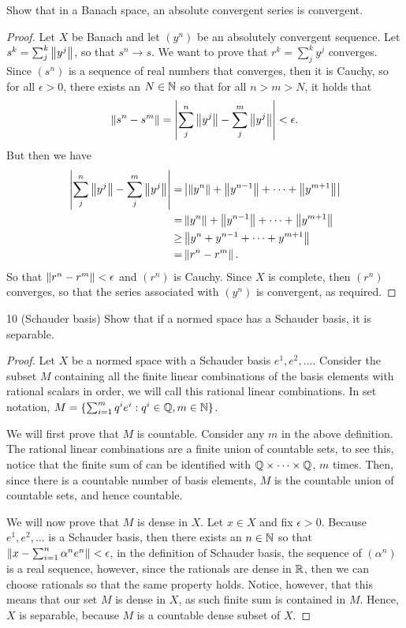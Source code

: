 \begin{exercise}{9}
Show that in a Banach space, an absolute convergent series is convergent.
\end{exercise}
\begin{proof}
Let $X$ be Banach and let $(y^n)$ be an absolutely convergent sequence. Let $s^k=\sum^k_j \left\lVert y^j\right\rVert$, so that $s^n\to s$. We want to prove that $r^k=\sum^k_j y^j$ converges. Since $(s^n)$ is a sequence of real numbers that converges,  then it is Cauchy, so for all $\epsilon>0$, there exists an $N\in\mathbb{N}$ so that for all $n>m>N$, it holds that
\[
    \left\lVert s^n-s^m\right\rVert = \left\lvert \sum^n_j \left\lVert y^j\right\rVert-\sum^m_j \left\lVert y^j\right\rVert\right\rvert <\epsilon.
\]
But then we have
\begin{align*}
    \left\lvert \sum^n_j \left\lVert y^j\right\rVert-\sum^m_j \left\lVert y^j\right\rVert\right\rvert
    =& \left\lvert \left\lVert y^n\right\rVert+\left\lVert y^{n-1}\right\rVert+\dots+\left\lVert y^{m+1}\right\rVert\right\rvert\\
    =& \left\lVert y^n\right\rVert+\left\lVert y^{n-1}\right\rVert+\dots+\left\lVert y^{m+1}\right\rVert\\
    \geq& \left\lVert y^n+y^{n-1}+\dots+y^{m+1}\right\rVert\\
    =& \left\lVert r^n-r^m\right\rVert.
\end{align*}
So that $\left\lVert r^n-r^m\right\rVert<\epsilon$ and $(r^n)$ is Cauchy. Since $X$ is complete, then $(r^n)$ converges, so that the series associated with $(y^n)$ is convergent, as required.
\end{proof}

\begin{exercise}{10 (Schauder basis)}
Show that if a normed space has a Schauder basis, it is separable.
\end{exercise}
\begin{proof}
Let $X$ be a normed space with a Schauder basis $e^1,e^2,\dots$. Consider the subset $M$ containing all the finite linear combinations of the basis elements with rational scalars in order, we will call this rational linear combinations. In set notation, $M=\{\sum_{i=1}^m q^ie^i:q^i\in\mathbb{Q}, m\in\mathbb{N}\}$.

We will first prove that $M$ is countable. Consider any $m$ in the above definition. The rational linear combinations are a finite union of countable sets, to see this, notice that the finite sum of can be identified with $\mathbb{Q}\times\dots\times\mathbb{Q}$, $m$ times. Then, since there is a countable number of basis elements, $M$ is the countable union of countable sets, and hence countable.

We will now prove that $M$ is dense in $X$. Let $x\in X$ and fix $\epsilon>0$. Because $e^1,e^2,\dots$ is a Schauder basis, then there exists an $n\in\mathbb{N}$ so that $\left\lVert x-\sum_{i=1}^n\alpha^ne^n\right\rVert<\epsilon$, in the definition of Schauder basis, the sequence of $(\alpha^n)$ is a real sequence, however, since the rationals are dense in $\mathbb{R}$, then we can choose rationals so that the same property holds. Notice, however, that this means that our set $M$ is dense in $X$, as such finite sum is contained in $M$. Hence, $X$ is separable, because $M$ is a countable dense subset of $X$.
\end{proof}

